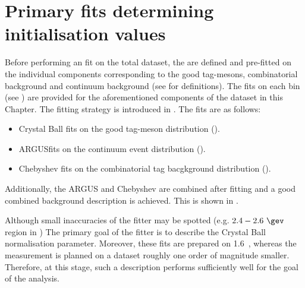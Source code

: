 \chapter{Primary \texorpdfstring{\Mbc}{Mbc} fits determining initialisation values}\label{sec:appendix_primary_fits}
Before performing an \Mbc fit on the total dataset, the  are defined and pre-fitted on the individual components corresponding to the good tag-\B mesons, combinatorial \BB background and continuum background (see  for definitions).
The \Mbc fits on each \EB bin (see ) are provided for the aforementioned components of the dataset in this Chapter.
The fitting strategy is introduced in .
The fits are as follows:
\begin{itemize}
    \item Crystal Ball \PDF fits on the good tag-\B meson \Mbc distribution ().
    \item ARGUS\PDF fits on the continuum event \Mbc distribution ().
    \item Chebyshev \PDF fits on the combinatorial \BB tag bacgkground distribution ().
\end{itemize}
Additionally, the ARGUS and Chebyshev  are combined after fitting and a good combined background description is achieved.
This is shown in  .

Although small inaccuracies of the fitter may be spotted (e.g. $2.4-2.6~\gev$ region in ) The primary goal of the fitter is to describe the Crystal Ball normalisation parameter.
Moreover, these fits are prepared on 1.6~\invab, whereas the measurement is planned on a dataset roughly one order of magnitude smaller.
Therefore, at this stage, such a description performs sufficiently well for the goal of the analysis.

